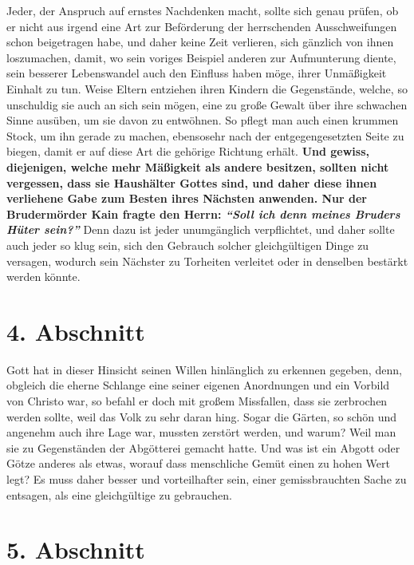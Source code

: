 Jeder, der Anspruch auf ernstes Nachdenken macht, sollte sich genau prüfen, ob
er nicht aus irgend eine Art zur Beförderung der herrschenden Ausschweifungen
schon beigetragen habe, und daher keine Zeit verlieren, sich gänzlich von ihnen
loszumachen, damit, wo sein voriges Beispiel anderen zur Aufmunterung
diente, sein besserer Lebenswandel auch den Einfluss haben möge, ihrer
Unmäßigkeit Einhalt zu tun. Weise
Eltern
entziehen ihren Kindern die
Gegenstände, welche, so unschuldig sie auch an sich sein mögen, eine zu große
Gewalt über ihre schwachen Sinne ausüben, um sie davon zu entwöhnen. So pflegt
man auch einen krummen Stock, um ihn gerade zu machen, ebensosehr nach der
entgegengesetzten Seite zu biegen, damit er auf diese Art die gehörige Richtung
erhält.  \label{ref:18_03_vorbild}\textbf{Und gewiss,
diejenigen, welche mehr
Mäßigkeit als andere besitzen,
sollten nicht vergessen, dass sie Haushälter Gottes sind, und daher diese ihnen
verliehene Gabe zum Besten ihres Nächsten anwenden. Nur der Brudermörder
Kain
fragte den Herrn:
\textit{"`Soll ich denn meines Bruders Hüter sein?"'}}
Denn dazu ist jeder unumgänglich verpflichtet, und daher sollte auch jeder
so klug sein, sich den Gebrauch solcher gleichgültigen Dinge zu versagen,
wodurch sein Nächster zu Torheiten verleitet oder in denselben bestärkt werden
könnte.

\section{4. Abschnitt} \label{kap18_ab4}

Gott hat in dieser Hinsicht seinen Willen hinlänglich zu erkennen gegeben, denn,
obgleich die eherne Schlange eine seiner eigenen Anordnungen und
ein Vorbild von
Christo war, so befahl er doch mit großem Missfallen, dass sie zerbrochen werden
sollte, weil das Volk zu sehr daran hing. Sogar die Gärten, so schön und
angenehm
auch ihre Lage war, mussten zerstört werden, und warum? Weil man sie zu
Gegenständen der Abgötterei gemacht hatte. Und was ist
ein
Abgott oder Götze
anderes als etwas, worauf dass menschliche Gemüt einen zu hohen Wert legt? Es
muss daher besser und vorteilhafter sein, einer gemissbrauchten Sache zu
entsagen, als eine gleichgültige zu gebrauchen.

\section{5. Abschnitt} \label{kap18_ab5}

